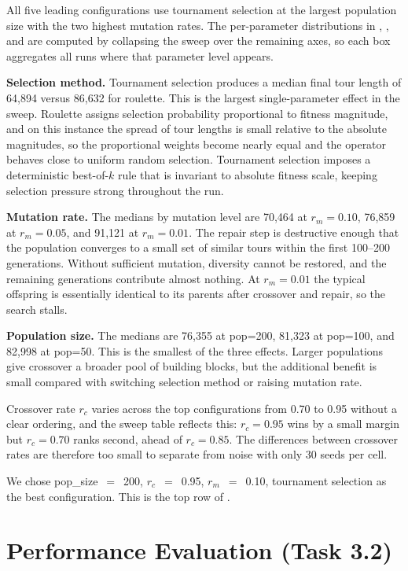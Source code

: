 All five leading configurations use tournament selection at the largest
population size with the two highest mutation rates. The per-parameter
distributions in , ,
and  are computed by collapsing the sweep
over the remaining axes, so each box aggregates all runs where that
parameter level appears.

\textbf{Selection method.} Tournament selection produces a median final
tour length of 64,894 versus 86,632 for roulette. This is the largest
single-parameter effect in the sweep. Roulette assigns selection
probability proportional to fitness magnitude, and on this instance the
spread of tour lengths is small relative to the absolute magnitudes, so the
proportional weights become nearly equal and the operator behaves close
to uniform random selection. Tournament selection imposes a deterministic best-of-$k$
rule that is invariant to absolute fitness scale, keeping selection
pressure strong throughout the run.

\textbf{Mutation rate.} The medians by mutation level are 70,464 at
$r_m = 0.10$, 76,859 at $r_m = 0.05$, and 91,121 at $r_m = 0.01$. The
repair step is destructive enough that the population converges to a
small set of similar tours within the first 100--200 generations.
Without sufficient mutation, diversity cannot be restored, and the
remaining generations contribute almost nothing. At $r_m = 0.01$ the
typical offspring is essentially identical to its parents after crossover
and repair, so the search stalls.

\textbf{Population size.} The medians are 76,355 at pop=200, 81,323 at
pop=100, and 82,998 at pop=50. This is the smallest of the three effects.
Larger populations give crossover a broader pool of building blocks, but
the additional benefit is small compared with switching selection method
or raising mutation rate.

Crossover rate $r_c$ varies across the top configurations from 0.70 to
0.95 without a clear ordering, and the sweep table reflects this:
$r_c = 0.95$ wins by a small margin but $r_c = 0.70$ ranks second, ahead
of $r_c = 0.85$. The differences between crossover rates are therefore
too small to separate from noise with only 30 seeds per cell.

We chose pop\_size~$=$~200, $r_c$~$=$~0.95, $r_m$~$=$~0.10, tournament
selection as the best configuration. This is the top row of
.

\section{Performance Evaluation (Task 3.2)}
\label{T3:Performance}

